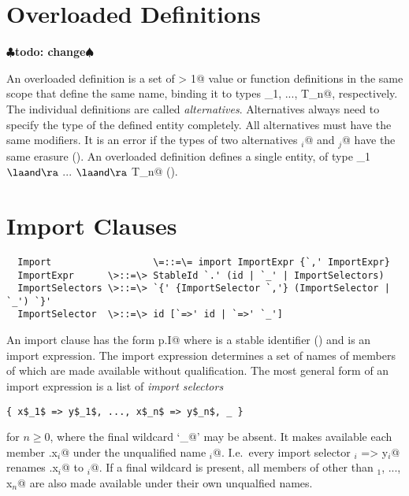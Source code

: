 \documentclass[11pt]{report}
\renewcommand{\todo}[1]{{$\clubsuit$\bf todo: #1$\spadesuit$}}
\begin{document}
\section{Overloaded Definitions}
\label{sec:overloaded-defs}
\todo{change}

An overloaded definition is a set of \verb@n > 1@ value or function
definitions in the same scope that define the same name, binding it to
types \verb@T_1, ..., T_n@, respectively.  The individual
definitions are called {\em alternatives}.  Alternatives always need
to specify the type of the defined entity completely.  All
alternatives must have the same modifiers. It is an error if the types
of two alternatives \verb@T$_i$@ and \verb@T$_j$@ have the same erasure
().  An overloaded definition defines a single
entity, of type \verb@T_1 $\overload$ ... $\overload$ T_n@
().

\section{Import Clauses}
\label{sec:import}

\syntax\begin{verbatim}
  Import                  \=::=\= import ImportExpr {`,' ImportExpr}
  ImportExpr      \>::=\> StableId `.' (id | `_' | ImportSelectors)
  ImportSelectors \>::=\> `{' {ImportSelector `,'} (ImportSelector | `_') `}'
  ImportSelector  \>::=\> id [`=>' id | `=>' `_']
\end{verbatim}

An import clause has the form \verb@import p.I@ where \verb@p@ is a stable
identifier () and \verb@I@ is an import expression.
The import expression determines a set of names of members of \verb@p@
which are made available without qualification. The most general form
of an import expression is a list of {\em import selectors}
\begin{verbatim}
{ x$_1$ => y$_1$, ..., x$_n$ => y$_n$, _ }
\end{verbatim}
for $n \geq 0$, where the final wildcard `\verb@_@' may be absent.  It
makes available each member \verb@p.x$_i$@ under the unqualified name
\verb@y$_i$@. I.e.\ every import selector \verb@x$_i$ => y$_i$@ renames
\verb@p.x$_i$@ to
\verb@y$_i$@.  If a final wildcard is present, all members \verb@z@ of
\verb@p@ other than \verb@x$_1$, ..., x$_n$@ are also made available
under their own unqualfied names.
\end{document}

